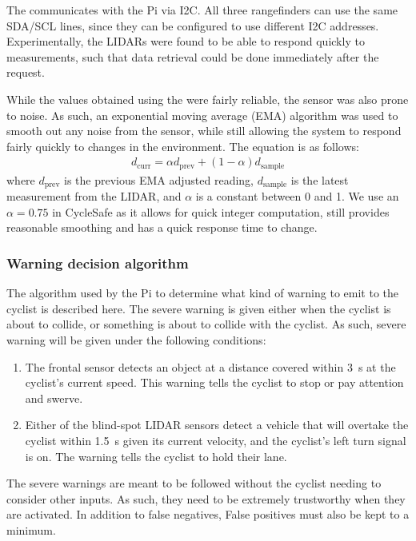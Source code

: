 \documentclass[journal]{IEEEtran}
\begin{document}
The \lidar{} communicates with the Pi via I2C. All three rangefinders can use the same SDA/SCL lines, since they can be configured to use different I2C addresses. Experimentally, the LIDARs were found to be able to respond quickly to measurements, such that data retrieval could be done immediately after the request.

While the values obtained using the \lidar{} were fairly reliable, the sensor was also prone to noise. As such, an exponential moving average (EMA) algorithm was used to smooth out any noise from the sensor, while still allowing the system to respond fairly quickly to changes in the environment. The equation is as follows:
\begin{align}
    d_\text{curr} = \alpha d_\text{prev} + (1 - \alpha) d_\text{sample}
\end{align}
where $d_\text{prev}$ is the previous EMA adjusted reading, $d_\text{sample}$ is the latest measurement from the LIDAR, and $\alpha$ is a constant between 0 and 1. We use an $\alpha=0.75$ in CycleSafe as it allows for quick integer computation, still provides reasonable smoothing and has a quick response time to change.

\subsubsection{Warning decision algorithm}
The algorithm used by the Pi to determine what kind of warning to emit to the cyclist is described here. The severe warning is given either when the cyclist is about to collide, or something is about to collide with the cyclist. As such, severe warning will be given under the following conditions:

\begin{enumerate}
    \item The frontal sensor detects an object at a distance covered within \SI{3}{\s} at the cyclist's current speed. This warning tells the cyclist to stop or pay attention and swerve.
    \item Either of the blind-spot LIDAR sensors detect a vehicle that will overtake the cyclist within \SI{1.5}{\s} given its current velocity, and the cyclist's left turn signal is on. The warning tells the cyclist to hold their lane.
\end{enumerate}

The severe warnings are meant to be followed without the cyclist needing to consider other inputs. As such, they need to be extremely trustworthy when they are activated. In addition to false negatives, False positives must also be kept to a minimum.
\end{document}
